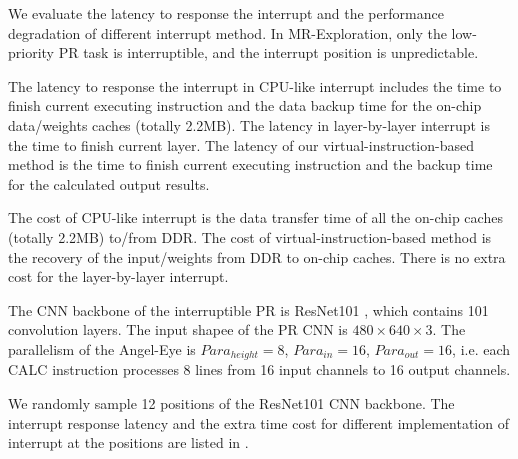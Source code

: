 We evaluate the latency to response the interrupt and the performance degradation of different interrupt method. In MR-Exploration, only the low-priority PR task is interruptible, and the interrupt position is unpredictable. 

The latency to response the interrupt in CPU-like interrupt includes the time to finish current executing instruction and the data backup time for the on-chip data/weights caches (totally 2.2MB). The latency in layer-by-layer interrupt is the time to finish current layer. The latency of our virtual-instruction-based method is the time to finish current executing instruction and the backup time for the calculated output results. 

The cost of CPU-like interrupt is the data transfer time of all the on-chip caches (totally 2.2MB) to/from DDR. The cost of virtual-instruction-based method is the recovery of the input/weights from DDR to on-chip caches. There is no extra cost for the layer-by-layer interrupt.


The CNN backbone of the interruptible PR is ResNet101 \cite{he2016deep}, which contains 101 convolution layers. The input shapee of the PR CNN is $480 \times 640 \times 3$. The parallelism of the Angel-Eye is $Para_{height}=8$, $Para_{in}=16$, $Para_{out}=16$, i.e. each CALC instruction processes 8 lines from 16 input channels to 16 output channels. 

We randomly sample 12 positions of the ResNet101 CNN backbone. The interrupt response latency and the extra time cost for different implementation of interrupt at the positions are listed in .




